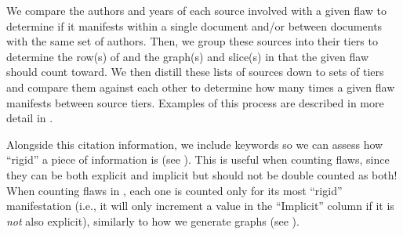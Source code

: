 We compare the authors and years of each source involved with a given flaw
to determine if it manifests within a single document and/or between documents
with the same set of authors. Then, we group these sources into their tiers
to determine the row(s) of  and the graph(s)
and slice(s) in  that the given flaw should count toward.
We then distill these lists of sources down to sets of tiers and compare them
against each other to determine how many times a given flaw manifests between
source tiers. Examples of this process are described in more detail in
.

\label{auto-flaw-analysis-rigidity}
Alongside this citation information, we include keywords so we can assess how
``rigid'' a piece of information is (see ). This is useful when
counting flaws, since they can be both explicit and implicit but should not be
double counted as both! When counting flaws in
, each one is
counted only for its most ``rigid'' manifestation (i.e., it will only increment
a value in the ``Implicit'' column if it is \emph{not} also explicit),
similarly to how we generate graphs (see ).

